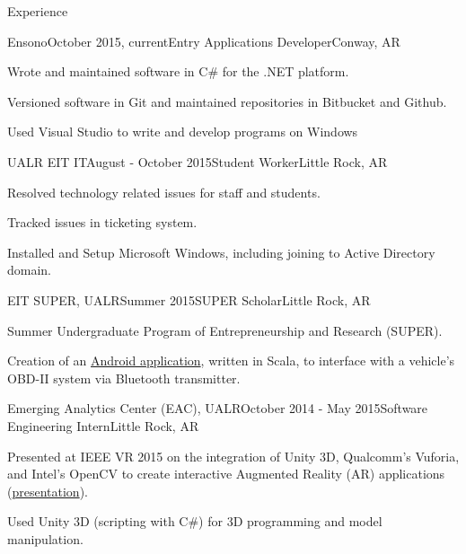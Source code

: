 \documentclass{resume} %
\begin{document}
\begin{rSection}{Experience}

\begin{rSubsection}{Ensono}{October 2015, current}{Entry Applications Developer}{Conway, AR}

	\item Wrote and maintained software in C\# for the .NET platform.
	\item Versioned software in Git and maintained repositories in Bitbucket and Github.
	\item Used Visual Studio to write and develop programs on Windows
\end{rSubsection}

\begin{rSubsection}{UALR EIT IT}{August - October 2015}{Student Worker}{Little Rock, AR}

	\item Resolved technology related issues for staff and students.
	\item Tracked issues in ticketing system.
	\item Installed and Setup Microsoft Windows, including joining to Active Directory domain.
\end{rSubsection}

\begin{rSubsection}{EIT SUPER, UALR}{Summer 2015}{SUPER Scholar}{Little Rock, AR}
	\item Summer Undergraduate Program of Entrepreneurship and Research (SUPER).
	\item Creation of an \href{http://github.com/cptaffe/flamethrower}{Android application}, written in Scala, to interface with a vehicle's OBD-II system via Bluetooth transmitter.
\end{rSubsection}

\begin{rSubsection}{Emerging Analytics Center (EAC), UALR}{October 2014 - May 2015}{Software Engineering Intern}{Little Rock, AR}
	\item Presented at IEEE VR 2015 on the integration of Unity 3D, Qualcomm's Vuforia, and Intel's OpenCV to create interactive Augmented Reality (AR) applications (\href{http://byteflame.org/ieee_vr/}{presentation}{}).
	\item Used Unity 3D (scripting with C\#) for 3D programming and model manipulation.
\end{rSubsection}


\end{rSection}
\end{document}
